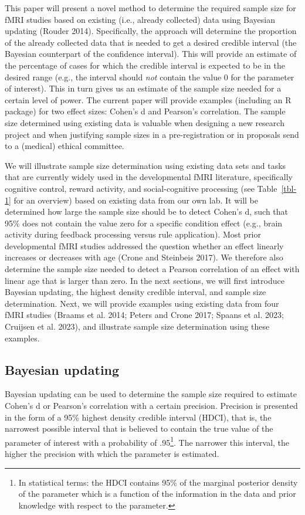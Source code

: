 \documentclass[
  letterpaper,
  DIV=11,
  numbers=noendperiod]{scrartcl}
\begin{document}
This paper will present a novel method to determine the required sample
size for fMRI studies based on existing (i.e., already collected) data
using Bayesian updating (Rouder 2014). Specifically, the approach will
determine the proportion of the already collected data that is needed to
get a desired credible interval (the Bayesian counterpart of the
confidence interval). This will provide an estimate of the percentage of
cases for which the credible interval is expected to be in the desired
range (e.g., the interval should \emph{not} contain the value 0 for the
parameter of interest). This in turn gives us an estimate of the sample
size needed for a certain level of power. The current paper will provide
examples (including an R package) for two effect sizes: Cohen's d and
Pearson's correlation. The sample size determined using existing data is
valuable when designing a new research project and when justifying
sample sizes in a pre-registration or in proposals send to a (medical)
ethical committee.

We will illustrate sample size determination using existing data sets
and tasks that are currently widely used in the developmental fMRI
literature, specifically cognitive control, reward activity, and
social-cognitive processing (see Table~\ref{tbl-1} for an overview)
based on existing data from our own lab. It will be determined how large
the sample size should be to detect Cohen's d, such that 95\% does not
contain the value zero for a specific condition effect (e.g., brain
activity during feedback processing versus rule application). Most prior
developmental fMRI studies addressed the question whether an effect
linearly increases or decreases with age (Crone and Steinbeis 2017). We
therefore also determine the sample size needed to detect a Pearson
correlation of an effect with linear age that is larger than zero. In
the next sections, we will first introduce Bayesian updating, the
highest density credible interval, and sample size determination. Next,
we will provide examples using existing data from four fMRI studies
(Braams et al. 2014; Peters and Crone 2017; Spaans et al. 2023; Cruijsen
et al. 2023), and illustrate sample size determination using these
examples.

\subsection{Bayesian updating}\label{bayesian-updating}

Bayesian updating can be used to determine the sample size required to
estimate Cohen's d or Pearson's correlation with a certain precision.
Precision is presented in the form of a 95\% highest density credible
interval (HDCI), that is, the narrowest possible interval that is
believed to contain the true value of the parameter of interest with a
probability of .95\footnote{In statistical terms: the HDCI contains 95\%
  of the marginal posterior density of the parameter which is a function
  of the information in the data and prior knowledge with respect to the
  parameter.}. The narrower this interval, the higher the precision with
which the parameter is estimated.
\end{document}
